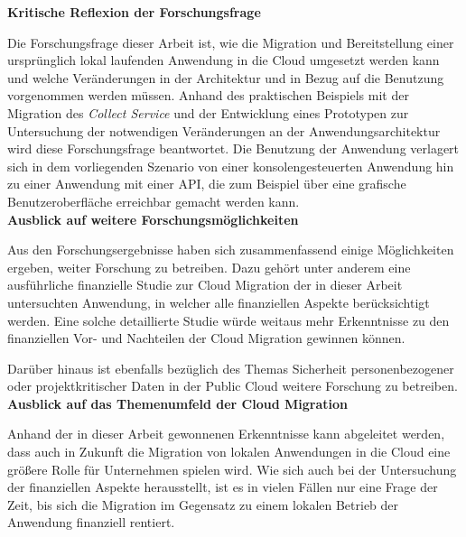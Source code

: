 \textbf{Kritische Reflexion der Forschungsfrage}

Die Forschungsfrage dieser Arbeit ist, wie die Migration und Bereitstellung einer ursprünglich lokal laufenden Anwendung in die Cloud umgesetzt werden kann und welche Veränderungen in der Architektur und in Bezug auf die Benutzung vorgenommen werden müssen. Anhand des praktischen Beispiels mit der Migration des \textit{Collect Service} und der Entwicklung eines Prototypen zur Untersuchung der notwendigen Veränderungen an der Anwendungsarchitektur wird diese Forschungsfrage beantwortet. Die Benutzung der Anwendung verlagert sich in dem vorliegenden Szenario von einer konsolengesteuerten Anwendung hin zu einer Anwendung mit einer \ac{API}, die zum Beispiel über eine grafische Benutzeroberfläche erreichbar gemacht werden kann. \\

\textbf{Ausblick auf weitere Forschungsmöglichkeiten}

Aus den Forschungsergebnisse haben sich zusammenfassend einige Möglichkeiten ergeben, weiter Forschung zu betreiben. Dazu gehört unter anderem eine ausführliche finanzielle Studie zur Cloud Migration der in dieser Arbeit untersuchten Anwendung, in welcher alle finanziellen Aspekte berücksichtigt werden. Eine solche detaillierte Studie würde weitaus mehr Erkenntnisse zu den finanziellen Vor- und Nachteilen der Cloud Migration gewinnen können.

Darüber hinaus ist ebenfalls bezüglich des Themas Sicherheit personenbezogener oder projektkritischer Daten in der Public Cloud weitere Forschung zu betreiben. \\

\textbf{Ausblick auf das Themenumfeld der Cloud Migration}

Anhand der in dieser Arbeit gewonnenen Erkenntnisse kann abgeleitet werden, dass auch in Zukunft die Migration von lokalen Anwendungen in die Cloud eine größere Rolle für Unternehmen spielen wird. Wie sich auch bei der Untersuchung der finanziellen Aspekte herausstellt, ist es in vielen Fällen nur eine Frage der Zeit, bis sich die Migration im Gegensatz zu einem lokalen Betrieb der Anwendung finanziell rentiert.